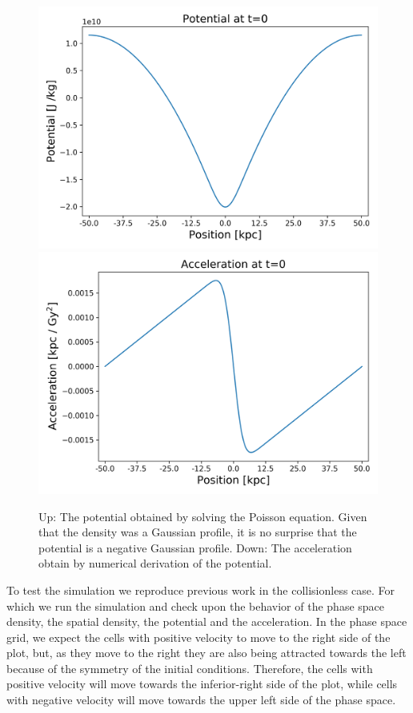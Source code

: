 \begin{figure}[h!]
    \centering
    \includegraphics[scale=0.6]{imag/1dInitPot.png}
    \includegraphics[scale=0.6]{imag/1dInitAcce.png}
    \caption{Up: The potential obtained by solving the Poisson equation. Given that the density was a Gaussian profile, it is no surprise that the potential is a negative Gaussian profile. Down: The acceleration obtain by numerical derivation of the potential.}
    \label{1dInit2}
\end{figure}

To test the simulation we reproduce previous work in the collisionless case.
For which we run the simulation and check upon the behavior of the phase space density, the spatial density, the potential and the acceleration.
In the phase space grid, we expect the cells with positive velocity to move to the right side of the plot, but, as they move to the right they are also being attracted towards the left because of the symmetry of the initial conditions. Therefore, the cells with positive velocity will move towards the inferior-right side of the plot, while cells with negative velocity will move towards the upper left side of the phase space.

